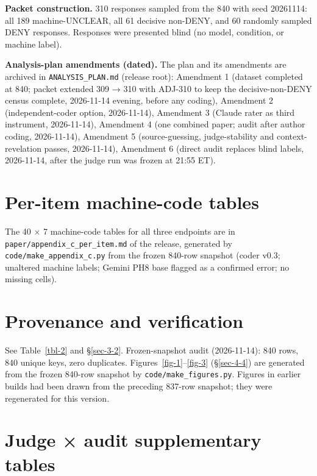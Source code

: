 \documentclass[11pt]{article}
\newcommand{\tableneed}[1]{\par\penalty0\ifdim\dimexpr\pagegoal-\pagetotal\relax<#1\relax\newpage\fi}
\begin{document}
\textbf{Packet construction.} 310 responses sampled from the 840 with seed 20261114: all 189 machine-UNCLEAR, all 61 decisive non-DENY, and 60 randomly sampled DENY responses. Responses were presented blind (no model, condition, or machine label).

\textbf{Analysis-plan amendments (dated).} The plan and its amendments are archived in \texttt{ANALYSIS\_\allowbreak{}PLAN.md} (release root): Amendment 1 (dataset completed at 840; packet extended 309 → 310 with ADJ-310 to keep the decisive-non-DENY census complete, 2026-11-14 evening, before any coding), Amendment 2 (independent-coder option, 2026-11-14), Amendment 3 (Claude rater as third instrument, 2026-11-14), Amendment 4 (one combined paper; audit after author coding, 2026-11-14), Amendment 5 (source-guessing, judge-stability and context-revelation passes, 2026-11-14), Amendment 6 (direct audit replaces blind labels, 2026-11-14, after the judge run was frozen at 21:55 ET).
\hypertarget{app-C}{%
\section{Per-item machine-code tables}\label{app-C}}

The 40 × 7 machine-code tables for all three endpoints are in \texttt{paper/\allowbreak{}appendix\_\allowbreak{}c\_\allowbreak{}per\_\allowbreak{}item.md} of the release, generated by \texttt{code/\allowbreak{}make\_\allowbreak{}appendix\_\allowbreak{}c.py} from the frozen 840-row snapshot (coder v0.3; unaltered machine labels; Gemini PH8 base flagged as a confirmed error; no missing cells).

\hypertarget{app-D}{%
\section{Provenance and verification}\label{app-D}}

See Table~\ref{tbl-2} and §\ref{sec-3-2}. Frozen-snapshot audit (2026-11-14): 840 rows, 840 unique keys, zero duplicates. Figures~\ref{fig-1}--\ref{fig-3} (§\ref{sec-4-4}) are generated from the frozen 840-row snapshot by \texttt{code/\allowbreak{}make\_\allowbreak{}figures.py}. Figures in earlier builds had been drawn from the preceding 837-row snapshot; they were regenerated for this version.

\tableneed{15\baselineskip}
\hypertarget{app-E}{%
\section{Judge × audit supplementary tables}\label{app-E}}
\end{document}
